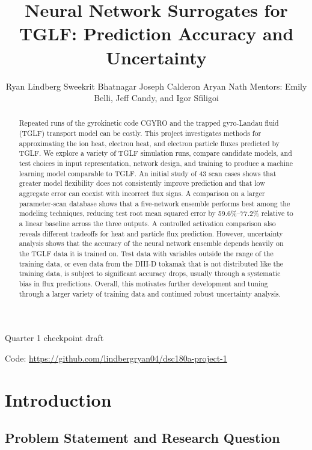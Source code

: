 \documentclass[12pt,letterpaper]{article}
\title{Neural Network Surrogates for TGLF: Prediction Accuracy and Uncertainty}
\author{Ryan Lindberg \And
  Sweekrit Bhatnagar \And
  Joseph Calderon \And
  Aryan Nath \AND
  {\normalfont Mentors: Emily Belli, Jeff Candy, and Igor Sfiligoi}}
\begin{document}
\maketitle
\begin{center}
  \small Quarter 1 checkpoint draft
\end{center}

\begin{abstract}
  Repeated runs of the gyrokinetic code CGYRO and the trapped gyro-Landau
  fluid (TGLF) transport model can be costly. This project
  investigates methods for approximating the ion heat, electron heat, and electron
  particle fluxes predicted by TGLF.
  We explore a variety of TGLF simulation runs, compare candidate models, and test
  choices in input representation, network design, and training to produce a machine learning model comparable to TGLF.
  An initial study of 43 scan cases shows that greater model flexibility does not consistently
  improve prediction and that low aggregate error can coexist with incorrect
  flux signs. A comparison on a larger parameter-scan database shows that a five-network
  ensemble performs best among the modeling techniques, reducing test root mean squared error
  by 59.6\%--77.2\% relative to a linear baseline across the three outputs. A controlled
  activation comparison also reveals different tradeoffs for heat and particle flux prediction.
  However, uncertainty analysis shows that the accuracy of the neural network ensemble depends
  heavily on the TGLF data it is trained on. Test data with variables outside the range of the
  training data, or even data from the DIII-D tokamak that is not distributed like the training data, is subject
  to significant accuracy drops, usually through a systematic bias in flux predictions. Overall,
  this motivates further development and tuning through a larger variety of training data and
  continued robust uncertainty analysis.
\end{abstract}

\begin{center}
  Code: \url{https://github.com/lindbergryan04/dsc180a-project-1}
\end{center}

\section{Introduction}
\subsection{Problem Statement and Research Question}
\end{document}
